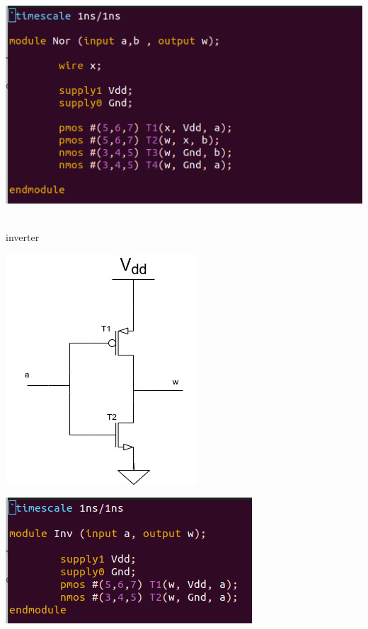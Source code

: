\begin{landscape}
\vspace*{-5.5cm}
\hspace*{7.5cm}\includegraphics[width = 0.5 \linewidth]{Nor.png}
\hspace*{2cm}
\end{landscape}

\\{\Large inverter}

\begin{landscape}
\vspace*{0cm}
\hspace*{-1.5cm}\includegraphics[width = 0.5 \linewidth]{Inv.jpg}
\hspace*{2cm}
\end{landscape}

\begin{landscape}
\vspace*{-5.5cm}
\hspace*{7.5cm}\includegraphics[width = 0.5 \linewidth]{Inv.png}
\hspace*{2cm}
\end{landscape}

